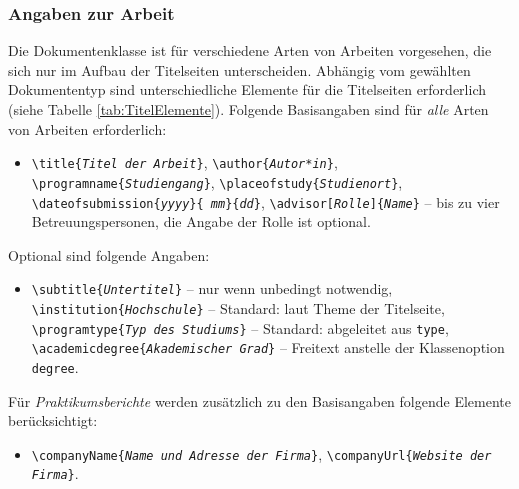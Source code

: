 \subsubsection{Angaben zur Arbeit}

Die Dokumentenklasse ist für verschiedene Arten von Arbeiten vorgesehen, die
sich nur im Aufbau der Titelseiten unterscheiden. Abhängig vom gewählten
Dokumententyp sind unterschiedliche Elemente für die Titelseiten erforderlich
(siehe Tabelle \ref{tab:TitelElemente}). Folgende Basisangaben sind für
\emph{alle} Arten von Arbeiten erforderlich:
%
\begin{itemize}
    \item[] %
    \verb!\title{!\texttt{\em Titel der Arbeit}\verb!}!, \newline%
    \verb!\author{!\texttt{\em Autor*in}\verb!}!, \newline%
    \verb!\programname{!\texttt{\em Studiengang}\verb!}!, \newline%
    \verb!\placeofstudy{!\texttt{\em Studienort}\verb!}!, \newline%
    \verb!\dateofsubmission{!\texttt{\em yyyy}\verb!}{!\texttt{\em
    mm}\verb!}{!\texttt{\em dd}\verb!}!, \newline%
    \verb!\advisor[!\texttt{\em Rolle}\verb!]{!\texttt{\em Name}\verb!}! --
    bis zu vier Betreuungspersonen, die Angabe der Rolle ist optional.
\end{itemize}
%
\noindent
Optional sind folgende Angaben:
%
\begin{itemize}
    \item[] %
    \verb!\subtitle{!\texttt{\em Untertitel}\verb!}! --
    nur wenn unbedingt notwendig, \newline%
    \verb!\institution{!\texttt{\em Hochschule}\verb!}! --
    Standard: laut Theme der Titelseite, \newline%
    \verb!\programtype{!\texttt{\em Typ des Studiums}\verb!}! --
    Standard: abgeleitet aus \texttt{type}, \newline%
    \verb!\academicdegree{!\texttt{\em Akademischer Grad}\verb!}! --
    Freitext anstelle der Klassenoption \texttt{degree}.
\end{itemize}
%
\noindent
Für \emph{Praktikumsberichte} werden zusätzlich zu den Basisangaben
folgende Elemente berücksichtigt:
%
\begin{itemize}
    \item[] %
    \verb!\companyName{!\texttt{\em Name und Adresse der Firma}\verb!}!,
    \newline%
    \verb!\companyUrl{!\texttt{\em Website der Firma}\verb!}!.
\end{itemize}

